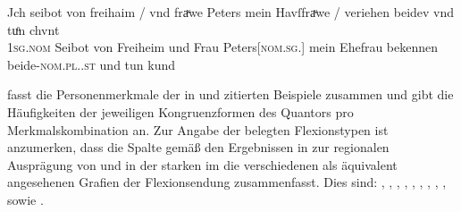 \begin{exe}
\ex \label{ex:beid2coordncao2}

		\gll Jch seibot von freihaim / vnd fraͮwe Peters mein
			Havſfraͮwe / veriehen beidev vnd tuͦn chvnt \\
			\textsc{1sg\subM.nom} Seibot von Freiheim {} und Frau
			Peters[\textsc{nom.sg.\FemF}] mein Ehefrau {} bekennen
			beide-\textsc{nom.pl.\NeutMF.st} und tun kund \\
		\trans {}
			\parencites(Nr.~3248, München, 1299)[416,23]{cao4}

\end{exe}

 fasst die Personenmerkmale der in
 und  zitierten Beispiele
zusammen und gibt die Häufigkeiten der jeweiligen Kongruenzformen
des Quantors pro Merkmalskombination an. Zur Angabe der belegten Flexionstypen
ist anzumerken, dass die Spalte  gemäß den Ergebnissen in
 zur regionalen Ausprägung von  und 
in der starken  im \CAO{} die verschiedenen als
äquivalent angesehenen Grafien der Flexionsendung zusammenfasst. Dies sind:
,
,
,
,
,
,
,
,
,
sowie
.


